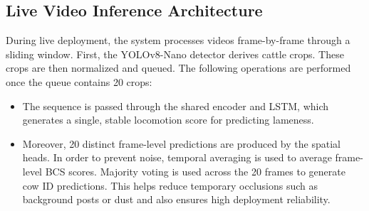\subsection{Live Video Inference Architecture}
During live deployment, the system processes videos frame-by-frame through a sliding window. First, the YOLOv8-Nano detector derives cattle crops. These crops are then normalized and queued. The following operations are performed once the queue contains 20 crops:
\begin{itemize}
    \item The sequence is passed through the shared encoder and LSTM, which generates a single, stable locomotion score for predicting lameness.
    \item Moreover, 20 distinct frame-level predictions are produced by the spatial heads. In order to prevent noise, temporal averaging is used to average frame-level BCS scores. Majority voting is used across the 20 frames to generate cow ID predictions. This helps reduce temporary occlusions such as background posts or dust and also ensures high deployment reliability.
\end{itemize}
